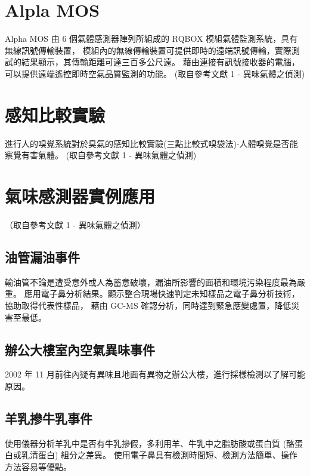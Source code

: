 \section{Alpla MOS}
Alpha MOS 由 6 個氣體感測器陣列所組成的 RQBOX 模組氣體監測系統，具有無線訊號傳輸裝置，
模組內的無線傳輸裝置可提供即時的遠端訊號傳輸，實際測試的結果顯示，其傳輸距離可達三百多公尺遠。
藉由連接有訊號接收器的電腦，可以提供遠端遙控即時空氣品質監測的功能。
(取自參考文獻 1 - 異味氣體之偵測) 

\section{感知比較實驗}
進行人的嗅覺系統對於臭氣的感知比較實驗(三點比較式嗅袋法)-人體嗅覺是否能察覺有害氣體。
(取自參考文獻 1 - 異味氣體之偵測) 

\section{氣味感測器實例應用}
（取自參考文獻 1 - 異味氣體之偵測）\\
	\subsection{油管漏油事件}
	輸油管不論是遭受意外或人為蓄意破壞，漏油所影響的面積和環境污染程度最為嚴重。
	應用電子鼻分析結果。顯示整合現場快速判定未知樣品之電子鼻分析技術，協助取得代表性樣品，
	藉由 GC-MS 確認分析，同時達到緊急應變處置，降低災害至最低。
	\subsection{辦公大樓室內空氣異味事件}
	2002 年 11 月前往內疑有異味且地面有異物之辦公大樓，進行採樣檢測以了解可能原因。
	\subsection{羊乳摻牛乳事件}
	使用儀器分析羊乳中是否有牛乳摻假，多利用羊、牛乳中之脂肪酸或蛋白質 (酪蛋白或乳清蛋白) 組分之差異。
	使用電子鼻具有檢測時間短、檢測方法簡單、操作方法容易等優點。

